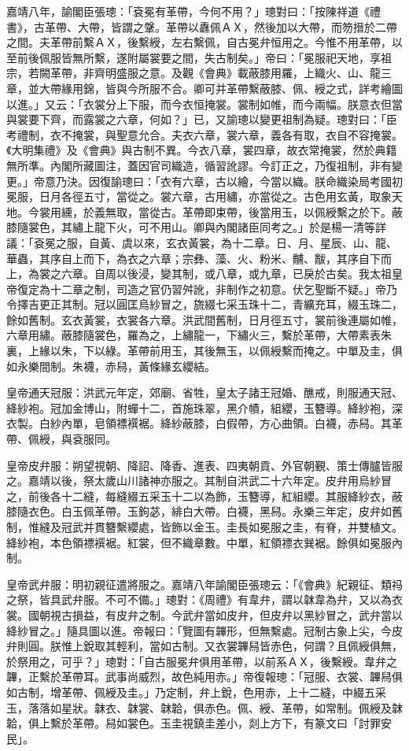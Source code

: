 嘉靖八年，諭閣臣張璁：「袞冕有革帶，今何不用？」璁對曰：「按陳祥道《禮書》，古革帶、大帶，皆謂之鞶。革帶以纛佩ＡＸ，然後加以大帶，而笏搢於二帶之間。夫革帶前繫ＡＸ，後繫綬，左右繫佩，自古冕弁恒用之。今惟不用革帶，以至前後佩服皆無所繫，遂附屬裳要之間，失古制矣。」帝曰：「冕服祀天地，享祖宗，若闕革帶，非齊明盛服之意。及觀《會典》載蔽膝用羅，上織火、山、龍三章，並大帶緣用錦，皆與今所服不合。卿可并革帶繫蔽膝、佩、綬之式，詳考繪圖以進。」又云：「衣裳分上下服，而今衣恒掩裳。裳制如帷，而今兩幅。朕意衣但當與裳要下齊，而露裳之六章，何如？」已，又諭璁以變更祖制為疑。璁對曰：「臣考禮制，衣不掩裳，與聖意允合。夫衣六章，裳六章，義各有取，衣自不容掩裳。《大明集禮》及《會典》與古制不異。今衣八章，裳四章，故衣常掩裳，然於典籍無所準。內閣所藏圖注，蓋因官司織造，循習訛謬。今訂正之，乃復祖制，非有變更。」帝意乃決。因復諭璁曰：「衣有六章，古以繪，今當以織。朕命織染局考國初冕服，日月各徑五寸，當從之。裳六章，古用繡，亦當從之。古色用玄黃，取象天地。今裳用纁，於義無取，當從古。革帶即束帶，後當用玉，以佩綬繫之於下。蔽膝隨裳色，其繡上龍下火，可不用山。卿與內閣諸臣同考之。」於是楊一清等詳議：「袞冕之服，自黃、虞以來，玄衣黃裳，為十二章。日、月、星辰、山、龍、華蟲，其序自上而下，為衣之六章；宗彝、藻、火、粉米、黼、黻，其序自下而上，為裳之六章。自周以後浸，變其制，或八章，或九章，已戾於古矣。我太祖皇帝復定為十二章之制，司造之官仍習舛訛，非制作之初意。伏乞聖斷不疑。」帝乃令擇吉更正其制。冠以圓匡烏紗冒之，旒綴七采玉珠十二，青纊充耳，綴玉珠二，餘如舊制。玄衣黃裳，衣裳各六章。洪武間舊制，日月徑五寸，裳前後連屬如帷，六章用繡。蔽膝隨裳色，羅為之，上繡龍一，下繡火三，繫於革帶，大帶素表朱裏，上緣以朱，下以綠。革帶前用玉，其後無玉，以佩綬繫而掩之。中單及圭，俱如永樂間制。朱襪，赤舄，黃條緣玄纓結。

皇帝通天冠服：洪武元年定，郊廟、省牲，皇太子諸王冠婚、醮戒，則服通天冠、絳紗袍。冠加金博山，附蟬十二，首施珠翠，黑介幘，組纓，玉簪導。絳紗袍，深衣製。白紗內單，皂領褾襈裾。絳紗蔽膝，白假帶，方心曲領。白襪，赤舄。其革帶、佩綬，與袞服同。

皇帝皮弁服：朔望視朝、降詔、降香、進表、四夷朝貢、外官朝覲、策士傳臚皆服之。嘉靖以後，祭太歲山川諸神亦服之。其制自洪武二十六年定。皮弁用烏紗冒之，前後各十二縫，每縫綴五采玉十二以為飾，玉簪導，紅組纓。其服絳紗衣，蔽膝隨衣色。白玉佩革帶。玉鉤苾，緋白大帶。白襪，黑舄。永樂三年定，皮弁如舊制，惟縫及冠武并貫簪繫纓處，皆飾以金玉。圭長如冕服之圭，有脊，并雙植文。絳紗袍，本色領褾襈裾。紅裳，但不織章數。中單，紅領褾衣巽裾。餘俱如冕服內制。

皇帝武弁服：明初親征遣將服之。嘉靖八年諭閣臣張璁云：「《會典》紀親征、類祃之祭，皆具武弁服。不可不備。」璁對：《周禮》有韋弁，謂以韎韋為弁，又以為衣裳。國朝視古損益，有皮弁之制。今武弁當如皮弁，但皮弁以黑紗冒之，武弁當以絳紗冒之。」隨具圖以進。帝報曰：「覽圖有韠形，但無繫處。冠制古象上尖，今皮弁則圓。朕惟上銳取其輕利，當如古制。又衣裳韠舄皆赤色，何謂？且佩綬俱無，於祭用之，可乎？」璁對：「自古服冕弁俱用革帶，以前系ＡＸ，後繫綬。韋弁之韠，正繫於革帶耳。武事尚威烈，故色純用赤。」帝復報璁：「冠服、衣裳、韠舄俱如古制，增革帶、佩綬及圭。」乃定制，弁上銳，色用赤，上十二縫，中綴五采玉，落落如星狀。韎衣、韎裳、韎韐，俱赤色。佩、綬、革帶，如常制。佩綬及韎韐，俱上繫於革帶。舄如裳色。玉圭視鎮圭差小，剡上方下，有篆文曰「討罪安民」。

